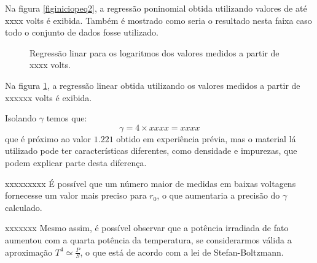 \documentclass[brazilian,12pt,a4paper,final]{article}
\begin{document}
Na figura \ref{figiniciopeq2}, a regressão poninomial obtida utilizando 
valores de até xxxx volts é exibida.
Também é mostrado como seria o resultado nesta faixa caso todo o 
conjunto de dados fosse utilizado.

\begin{figure}[htbp!]
  \caption{Regressão linar para os logaritmos dos valores medidos a partir de xxxx volts.}
  \label{figfimpeq2}
  \centering
\end{figure}

Na figura \ref{figfimpeq2}, a regressão linear obtida utilizando 
os valores medidos a partir de xxxxxx volts é exibida.

Isolando $\gamma$ temos que:
$$\gamma=4\times xxxx=xxxx$$
que é próximo ao valor $1.221$ obtido em experiência prévia,
mas o material lá utilizado pode ter características diferentes,
como densidade e impurezas, que podem explicar parte desta diferença.

xxxxxxxxx
É possível que um número maior de medidas em baixas voltagens fornecesse
um valor mais preciso para $r_0$, o que aumentaria a precisão do $\gamma$
calculado.

xxxxxxx
Mesmo assim, é possível observar que a potência irradiada de fato aumentou
com a quarta potência da temperatura, se considerarmos válida a aproximação
$T^4\simeq \frac{P}{S}$, o que está de acordo com a lei de Stefan-Boltzmann.
\end{document}
